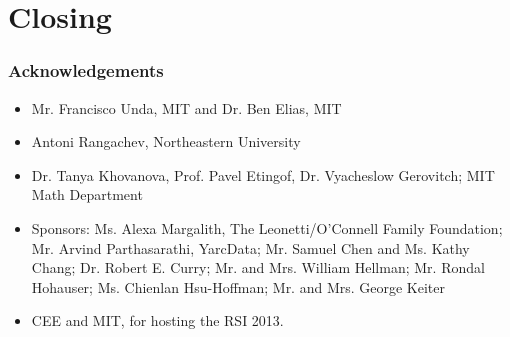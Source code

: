 \documentclass[pdf]{beamer}
\def\ii{\item}
\begin{document}
%
%
%

\section{Closing}
\begin{frame}
	\frametitle{Acknowledgements}
	\begin{itemize}
		\ii Mr. Francisco Unda, MIT and Dr. Ben Elias, MIT
		\ii Antoni Rangachev, Northeastern University
		\ii Dr. Tanya Khovanova, Prof. Pavel Etingof, Dr. Vyacheslow Gerovitch; MIT Math Department
		\ii Sponsors: Ms. Alexa Margalith, The Leonetti/O'Connell Family Foundation; Mr. Arvind Parthasarathi, YarcData; Mr. Samuel Chen and Ms. Kathy Chang; Dr. Robert E. Curry; Mr. and Mrs. William Hellman; Mr. Rondal Hohauser; Ms. Chienlan Hsu-Hoffman; Mr. and Mrs. George Keiter
		\ii CEE and MIT, for hosting the RSI 2013.
	\end{itemize}
\end{frame}
\end{document}
